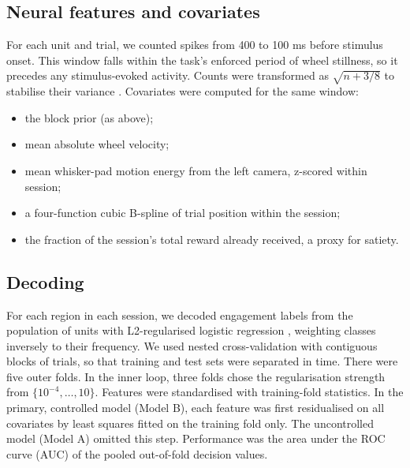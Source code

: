 \documentclass[11pt]{article}
\begin{document}
\subsection{Neural features and covariates}
For each unit and trial, we counted spikes from 400 to 100 ms before stimulus onset. This window falls within the task's enforced period of wheel stillness, so it precedes any stimulus-evoked activity. Counts were transformed as $\sqrt{n + 3/8}$ to stabilise their variance \citep{anscombe1948}. Covariates were computed for the same window:
\begin{itemize}
\item the block prior (as above);
\item mean absolute wheel velocity;
\item mean whisker-pad motion energy from the left camera, z-scored within session;
\item a four-function cubic B-spline of trial position within the session;
\item the fraction of the session's total reward already received, a proxy for satiety.
\end{itemize}

\subsection{Decoding}
For each region in each session, we decoded engagement labels from the population of units with L2-regularised logistic regression \citep{pedregosa2011}, weighting classes inversely to their frequency. We used nested cross-validation with contiguous blocks of trials, so that training and test sets were separated in time. There were five outer folds. In the inner loop, three folds chose the regularisation strength from $\{10^{-4},\dots,10\}$. Features were standardised with training-fold statistics. In the primary, controlled model (Model B), each feature was first residualised on all covariates by least squares fitted on the training fold only. The uncontrolled model (Model A) omitted this step. Performance was the area under the ROC curve (AUC) of the pooled out-of-fold decision values.
\end{document}
